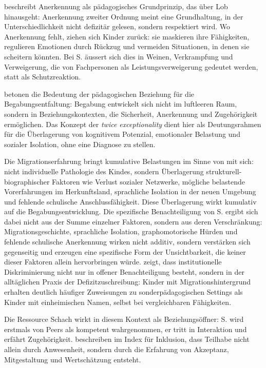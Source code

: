 \documentclass[ngerman, a4paper]{article}
\begin{document}
\textcite[S.\,89\psq]{grossrieder2010anerkennung} beschreibt Anerkennung als pädagogisches Grundprinzip, das über Lob
hinausgeht: Anerkennung zweiter Ordnung meint eine Grundhaltung, in der Unterschiedlichkeit
nicht defizitär gelesen, sondern respektiert wird.
Wo Anerkennung fehlt, ziehen sich Kinder zurück: sie maskieren ihre Fähigkeiten,
regulieren Emotionen durch Rückzug und vermeiden Situationen, in denen sie scheitern
könnten. Bei S. äussert sich dies in Weinen, Verkrampfung und Verweigerung, die von
Fachpersonen als Leistungsverweigerung gedeutet werden, statt als Schutzreaktion.
 
\textcite[S.\,35--57]{kuhl2019diversitaet} betonen die Bedeutung der pädagogischen Beziehung für die
Begabungsentfaltung: Begabung entwickelt sich nicht im luftleeren Raum, sondern in
Beziehungskontexten, die Sicherheit, Anerkennung und Zugehörigkeit ermöglichen. Das Konzept der \textit{twice exceptionality} dient
hier als Deutungsrahmen für die Überlagerung von kognitivem Potenzial, emotionaler
Belastung und sozialer Isolation, ohne eine Diagnose zu stellen.
 
Die Migrationserfahrung bringt kumulative Belastungen im Sinne von \textcite[S.\,86--98]{behrensen2019inklusive}
mit sich: nicht individuelle Pathologie des Kindes, sondern Überlagerung
strukturell-biographischer Faktoren wie Verlust sozialer Netzwerke, mögliche
belastende Vorerfahrungen im Herkunftsland, sprachliche Isolation in der
neuen Umgebung und fehlende schulische Anschlussfähigkeit. Diese
Überlagerung wirkt kumulativ auf die Begabungsentwicklung.
Die spezifische Benachteiligung von S. ergibt sich dabei nicht aus der Summe
einzelner Faktoren, sondern aus deren Verschränkung: Migrationsgeschichte,
sprachliche Isolation, graphomotorische Hürden und fehlende schulische
Anerkennung wirken nicht additiv, sondern verstärken sich gegenseitig
und erzeugen eine spezifische Form der Unsichtbarkeit, die keiner dieser
Faktoren allein hervorbringen würde.
\textcite[S.\,63--77]{kappus2010migration} zeigt, dass institutionelle Diskriminierung nicht nur in offener Benachteiligung
besteht, sondern in der alltäglichen Praxis der Defizitzuschreibung: Kinder mit
Migrationshintergrund erhalten deutlich häufiger Zuweisungen zu sonderpädagogischen
Settings als Kinder mit einheimischen Namen, selbst bei vergleichbaren Fähigkeiten.
 
Die Ressource Schach wirkt in diesem Kontext als Beziehungsöffner: S. wird erstmals
von Peers als kompetent wahrgenommen, er tritt in Interaktion und erfährt Zugehörigkeit.
\textcite[Dim.\,A--B]{booth2019index} beschreiben im Index für Inklusion, dass Teilhabe nicht allein durch
Anwesenheit, sondern durch die Erfahrung von Akzeptanz, Mitgestaltung und
Wertschätzung entsteht.
\end{document}
